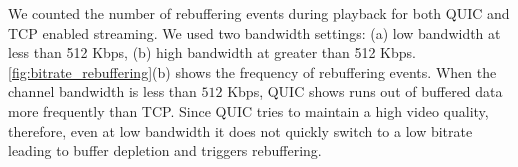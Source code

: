 
We counted the number of rebuffering events during playback for both \ac{QUIC} and \ac{TCP} enabled streaming.
We used two bandwidth settings: (a) low bandwidth at less than 512 Kbps, (b) high bandwidth at greater than 512 Kbps.
\fig\ref{fig:bitrate_rebuffering}(b) shows the frequency of rebuffering events.
When the channel bandwidth is less than $512$ Kbps, QUIC shows runs out of buffered data more frequently than TCP. 
Since QUIC tries to maintain a high video quality, therefore, even at low bandwidth it does not quickly switch to a low bitrate leading to buffer depletion and triggers rebuffering.


